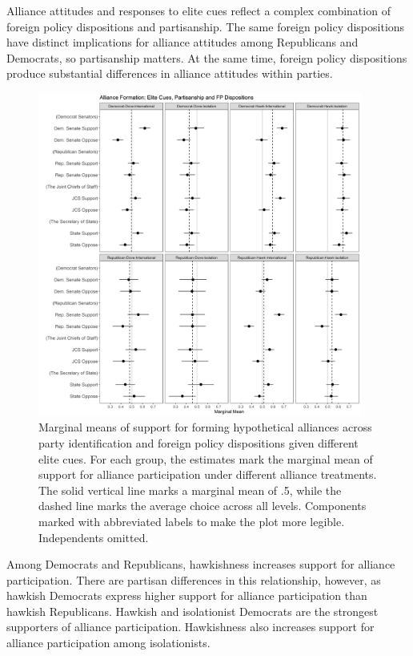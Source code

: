 \documentclass[12pt]{article}
\begin{document}
Alliance attitudes and responses to elite cues reflect a complex combination of foreign policy dispositions and partisanship. 
The same foreign policy dispositions have distinct implications for alliance attitudes among Republicans and Democrats, so partisanship matters.
At the same time, foreign policy dispositions produce substantial differences in alliance attitudes within parties.  


\begin{figure}[htpb]
	\centering
		\includegraphics[width=0.95\textwidth]{../figures/party-dispo-form-el.png}
	\caption{Marginal means of support for forming hypothetical alliances across party identification and foreign policy dispositions given different elite cues. For each group, the estimates mark the marginal mean of support for alliance participation under different alliance treatments. The solid vertical line marks a marginal mean of .5, while the dashed line marks the average choice across all levels. Components marked with abbreviated labels to make the plot more legible. Independents omitted.}
	\label{fig:party-dispo-form-el}
\end{figure}


Among Democrats and Republicans, hawkishness increases support for alliance participation. 
There are partisan differences in this relationship, however, as hawkish Democrats express higher support for alliance participation than hawkish Republicans. 
Hawkish and isolationist Democrats are the strongest supporters of alliance participation. 
Hawkishness also increases support for alliance participation among isolationists. 
\end{document}
